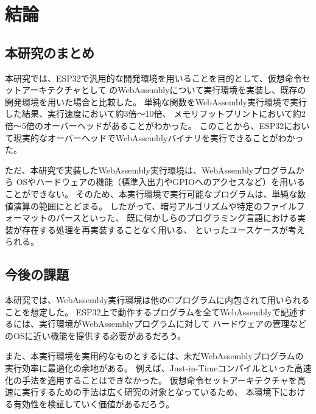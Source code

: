 \chapter{結論}
\label{chap:conclusion}

\section{本研究のまとめ}
\label{section:matome}

本研究では、ESP32で汎用的な開発環境を用いることを目的として、仮想命令セットアーキテクチャとして
のWebAssemblyについて実行環境を実装し、既存の開発環境を用いた場合と比較した。
単純な関数をWebAssembly実行環境で実行した結果、実行速度において約3倍〜10倍、
メモリフットプリントにおいて約2倍〜5倍のオーバーヘッドがあることがわかった。
このことから、ESP32において現実的なオーバーヘッドでWebAssemblyバイナリを実行できることがわかった。

ただ、本研究で実装したWebAssembly実行環境は、WebAssemblyプログラムから
OSやハードウェアの機能（標準入出力やGPIOへのアクセスなど）を用いることができない。
そのため、本実行環境で実行可能なプログラムは、単純な数値演算の範囲にとどまる。
したがって、暗号アルゴリズムや特定のファイルフォーマットのパースといった、
既に何かしらのプログラミング言語における実装が存在する処理を再実装することなく用いる、
といったユースケースが考えられる。

\section{今後の課題}

本研究では、WebAssembly実行環境は他のCプログラムに内包されて用いられることを想定した。
ESP32上で動作するプログラムを全てWebAssemblyで記述するには、実行環境がWebAssemblyプログラムに対して
ハードウェアの管理などのOSに近い機能を提供する必要があるだろう。

また、本実行環境を実用的なものとするには、未だWebAssemblyプログラムの実行効率に最適化の余地がある。
例えば、Just-in-Timeコンパイルといった高速化の手法を適用することはできなかった。
仮想命令セットアーキテクチャを高速に実行するための手法は広く研究の対象となっているため、
本環境下における有効性を検証していく価値があるだろう。
